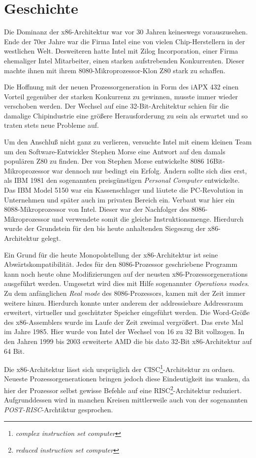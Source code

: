 \section{Geschichte}

Die Dominanz der x86-Architektur war vor 30 Jahren keineswegs vorauszusehen.
Ende der 70er Jahre war die Firma Intel eine von vielen Chip-Herstellern in der westlichen Welt.
Desweiteren hatte Intel mit Zilog Incorporation, einer Firma ehemaliger Intel Mitarbeiter, einen starken aufstrebenden Konkurrenten.
Dieser machte ihnen mit ihrem 8080-Mikroprozessor-Klon Z80 stark zu schaffen. 

Die Hoffnung mit der neuen Prozessorgeneration in Form des iAPX 432 einen Vorteil gegenüber der starken Konkurrenz zu gewinnen, musste immer wieder verschoben werden.
Der Wechsel auf eine 32-Bit-Architektur schien für die damalige Chipindustrie eine größere Herausforderung zu sein als erwartet und so traten stets neue Probleme auf.

Um den Anschluß nicht ganz zu verlieren, versuchte Intel mit einem kleinen Team um den Software-Entwickler Stephen Morse eine Antwort auf den damals populären Z80 zu finden.
Der von Stephen Morse entwickelte 8086 16Bit-Mikroprozessor war dennoch nur bedingt ein Erfolg.
Ändern sollte sich dies erst, als IBM 1981 den sogenannten preisgünstigen \textit{Personal Computer} entwickelte. Das IBM Model 5150 war ein Kassenschlager und läutete die PC-Revolution in Unternehmen und später auch im privaten Bereich ein.
Verbaut war hier ein 8088-Mikroprozessor von Intel. Dieser war der Nachfolger des 8086-Mikroprozessor und verwendete somit die gleiche Instruktionsmenge.
Hierdurch wurde der Grundstein für den bis heute anhaltenden Siegeszug der x86-Architektur gelegt.\cite{pcworld} 

Ein Grund für die heute Monopolstellung der x86-Architektur ist seine Abwärtskompatibilität.
Jedes für den 8086-Prozessor geschriebene Programm kann noch heute ohne Modifizierungen auf der neusten x86-Prozessorgenerations ausgeführt werden.
Umgesetzt wird dies mit Hilfe sogenannter \textit{Operations modes}. Zu dem anfänglichen \textit{Real mode} des 8086-Prozessors, kamen mit der Zeit immer weitere hinzu.
Hierdurch konnte unter anderem der addressiebare Addressraum erweitert, virtueller und geschützter Speicher eingeführt werden.
Die Word-Größe des x86-Assemblers wurde im Laufe der Zeit zweimal vergrößert. Das erste Mal im Jahre 1985. Hier wurde von Intel der Wechsel von 16 zu 32 Bit vollzogen. In den Jahren 1999 bis 2003 erweiterte AMD die bis dato 32-Bit x86-Architektur auf 64 Bit.

Die x86-Architektur lässt sich ursprüglich der CISC\footnote{\textit{complex instruction set computer}}-Architektur zu ordnen.
Neueste Prozessorgenerationen bringen jedoch diese Eindeutigkeit ins wanken, da hier der Prozessor selbst gewisse Befehle auf eine RISC\footnote{\textit{reduced instruction set computer}}-Architektur  reduziert.
Aufgrunddessen wird in manchen Kreisen mittlerweile auch von der sogenannten \textit{POST-RISC}-Archtiktur gesprochen.\cite{postrisc}
